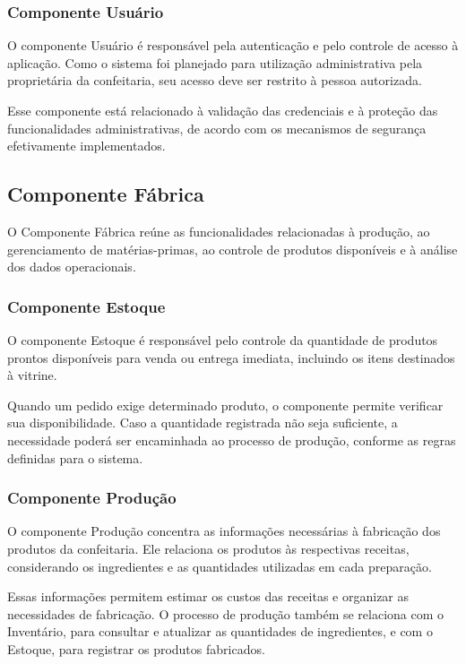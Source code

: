 \subsubsection{Componente Usuário}

O componente Usuário é responsável pela autenticação e pelo controle de acesso à aplicação. Como o sistema foi planejado para utilização administrativa pela proprietária da confeitaria, seu acesso deve ser restrito à pessoa autorizada.

Esse componente está relacionado à validação das credenciais e à proteção das funcionalidades administrativas, de acordo com os mecanismos de segurança efetivamente implementados.

\subsection{Componente Fábrica}

O Componente Fábrica reúne as funcionalidades relacionadas à produção, ao gerenciamento de matérias-primas, ao controle de produtos disponíveis e à análise dos dados operacionais.

\subsubsection{Componente Estoque}

O componente Estoque é responsável pelo controle da quantidade de produtos prontos disponíveis para venda ou entrega imediata, incluindo os itens destinados à vitrine.

Quando um pedido exige determinado produto, o componente permite verificar sua disponibilidade. Caso a quantidade registrada não seja suficiente, a necessidade poderá ser encaminhada ao processo de produção, conforme as regras definidas para o sistema.

\subsubsection{Componente Produção}

O componente Produção concentra as informações necessárias à fabricação dos produtos da confeitaria. Ele relaciona os produtos às respectivas receitas, considerando os ingredientes e as quantidades utilizadas em cada preparação.

Essas informações permitem estimar os custos das receitas e organizar as necessidades de fabricação. O processo de produção também se relaciona com o Inventário, para consultar e atualizar as quantidades de ingredientes, e com o Estoque, para registrar os produtos fabricados.


